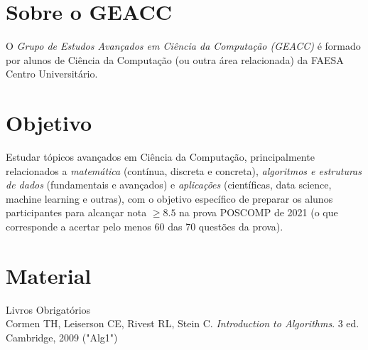 \documentclass[a4paper]{inzane_syllabus} %
\begin{document}

\makeprofile 


\section{Sobre o GEACC}

O \emph{Grupo de Estudos Avançados em Ciência da Computação (GEACC)} é
formado por alunos de Ciência da Computação (ou outra área relacionada) da
FAESA Centro Universitário.

\vspace{0.5cm} 
\section{Objetivo}

Estudar tópicos avançados em Ciência da Computação, principalmente relacionados
a \emph{matemática} (contínua, discreta e concreta), \emph{algoritmos e
estruturas de dados} (fundamentais e avançados) e \emph{aplicações} (científicas,
data science, machine learning e outras), com o objetivo específico de preparar
os alunos participantes para alcançar nota $\ge 8.5$ na prova POSCOMP de 2021 (o
que corresponde a acertar pelo menos 60 das 70 questões da prova).




\vspace{0.5cm} 
\section{Material}

{\color{myCOLOR} Livros Obrigatórios}\\
Cormen TH, Leiserson CE, Rivest RL, Stein C. \emph{Introduction to Algorithms}.
3 ed. Cambridge, 2009 ("Alg1") \\
\end{document}
